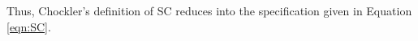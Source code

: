\documentclass[journal,compsoc]{IEEEtran}
\begin{document}
  Thus, Chockler's definition of SC reduces into the specification given in Equation \ref{eqn:SC}. 
\end{document}
